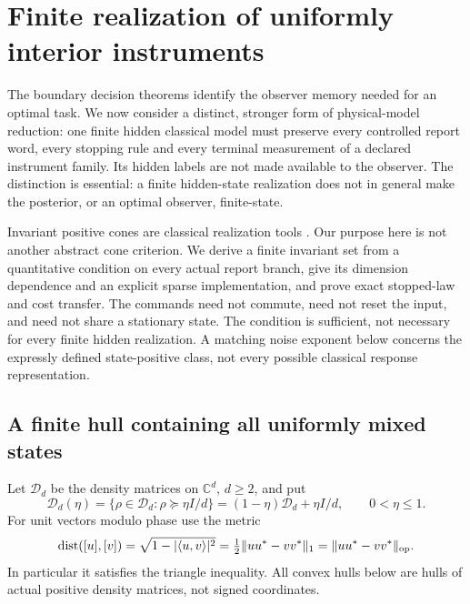 \section{Finite realization of uniformly interior instruments}\label{sec:interior-instruments}
The boundary decision theorems identify the observer memory needed for an optimal task. We now consider a distinct, stronger form of physical-model reduction: one finite hidden classical model must preserve every controlled report word, every stopping rule and every terminal measurement of a declared instrument family. Its hidden labels are not made available to the observer. The distinction is essential: a finite hidden-state realization does not in general make the posterior, or an optimal observer, finite-state.

Invariant positive cones are classical realization tools \cite{Heller65,MonrasWinter14}. Our purpose here is not another abstract cone criterion. We derive a finite invariant set from a quantitative condition on every actual report branch, give its dimension dependence and an explicit sparse implementation, and prove exact stopped-law and cost transfer. The commands need not commute, need not reset the input, and need not share a stationary state. The condition is sufficient, not necessary for every finite hidden realization. A matching noise exponent below concerns the expressly defined state-positive class, not every possible classical response representation.

\subsection{A finite hull containing all uniformly mixed states}
Let $\mathcal D_d$ be the density matrices on $\mathbb C^d$, $d\ge2$, and put
\[
 \mathcal D_d(\eta)=\{\rho\in\mathcal D_d:\rho\succeq\eta I/d\}
       =(1-\eta)\mathcal D_d+\eta I/d,\qquad 0<\eta\le1.
\]
For unit vectors modulo phase use the metric
\[
 \operatorname{dist}([u],[v])
 =\sqrt{1-|\langle u,v\rangle|^2}
 =\tfrac12\|uu^*-vv^*\|_1=\|uu^*-vv^*\|_{\rm op}.
\]
In particular it satisfies the triangle inequality. All convex hulls below are hulls of actual positive density matrices, not signed coordinates.

